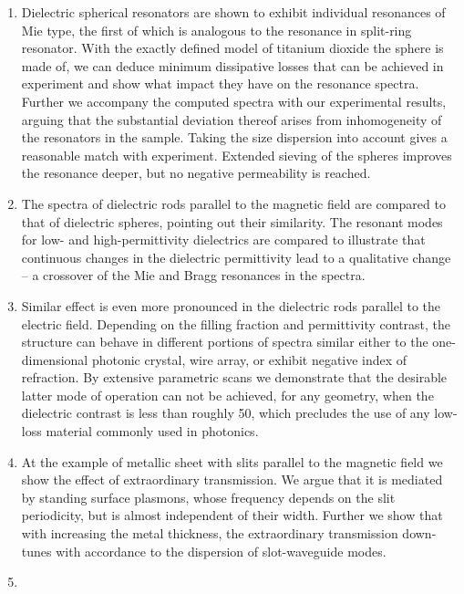 \begin{enumerate}
{} 
\item{Dielectric spherical resonators are shown to exhibit individual resonances of Mie type, the first of which is analogous to the resonance in split-ring resonator. With the exactly defined model of titanium dioxide the sphere is made of, we can deduce minimum dissipative losses that can be achieved in experiment and show what impact they have on the resonance spectra. Further we accompany the computed spectra with our experimental results, arguing that the substantial deviation thereof arises from inhomogeneity of the resonators in the sample. Taking the size dispersion into account gives a reasonable match with experiment. Extended sieving of the spheres improves the resonance deeper, but no negative permeability is reached.
} 
\item{The spectra of dielectric rods parallel to the magnetic field are compared to that of dielectric spheres, pointing out their similarity. The resonant modes for low- and high-permittivity dielectrics are compared to illustrate that continuous changes in the dielectric permittivity lead to a qualitative change -- a crossover of the Mie and Bragg resonances in the spectra.
} 
\item{Similar effect is even more pronounced in the dielectric rods parallel to the electric field. Depending on the filling fraction and permittivity contrast, the structure can behave in different portions of spectra similar either to the one-dimensional photonic crystal, wire array, or exhibit negative index of refraction. By extensive parametric scans we demonstrate that the desirable latter mode of operation  can not be achieved, for any geometry, when the dielectric contrast is less than roughly 50, which precludes the use of any low-loss material commonly used in photonics. 
} 
\item{At the example of metallic sheet with slits parallel to the magnetic field we show the effect of extraordinary transmission. We argue that it is mediated by standing surface plasmons, whose frequency depends on the slit periodicity, but is almost independent of their width. Further we show that with increasing the metal thickness, the extraordinary transmission down-tunes with accordance to the dispersion of slot-waveguide modes.
} 
\item{%
}
\end{enumerate}





